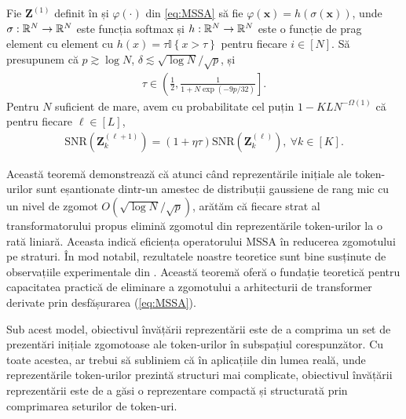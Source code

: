 \documentclass[../../book-main_ro.tex]{subfiles}
\begin{document}
\begin{theorem}\label{thm:1}
Fie $\bm Z^{(1)}$ definit în  și $\varphi(\cdot)$ din \eqref{eq:MSSA} să fie
$\varphi(\bm x) = h\left(\sigma(\bm x)\right)$,
unde $\sigma:\mathbb{R}^N \to \mathbb{R}^N$ este funcția softmax și $h:\mathbb{R}^N \to \mathbb{R}^N$ este o funcție de prag element cu element cu $h(x) = \tau \mathbb{I}\left\{x > \tau\right\}$ pentru fiecare $i \in [N]$. Să presupunem că $p \gtrsim \log N$, $\delta \lesssim \sqrt{\log N}/\sqrt{p}$, și
\begin{align*}
\tau \in \left( \frac{1}{2},  \frac{1}{1+N\exp(-9p/32)} \right].
\end{align*}
Pentru $N$ suficient de mare, avem cu probabilitate cel puțin $1-KLN^{-\Omega(1)}$ că pentru fiecare $\ell \in [L]$,
    \begin{align}\label{eq:SNR}
        \mathrm{SNR}(\bm Z_k^{(\ell+1)}) = (1+\eta\tau) \mathrm{SNR}(\bm Z_k^{(\ell)}),\ \forall k \in [K].
    \end{align}
\end{theorem}
Această teoremă demonstrează că atunci când reprezentările inițiale ale token-urilor sunt eșantionate dintr-un amestec de distribuții gaussiene de rang mic cu un nivel de zgomot $O(\sqrt{\log N}/\sqrt{p})$, arătăm că fiecare strat al transformatorului propus elimină zgomotul din reprezentările token-urilor la o rată liniară. Aceasta indică eficiența operatorului MSSA în reducerea zgomotului pe straturi. În mod notabil, rezultatele noastre teoretice sunt bine susținute de observațiile experimentale din . Această teoremă oferă o fundație teoretică pentru capacitatea practică de eliminare a zgomotului a arhitecturii de transformer derivate prin desfășurarea (\ref{eq:MSSA}).

\begin{remark}
    Sub acest model, obiectivul învățării reprezentării este de a comprima un set de prezentări inițiale zgomotoase ale token-urilor în subspațiul corespunzător. Cu toate acestea, ar trebui să subliniem că în aplicațiile din lumea reală, unde reprezentările token-urilor prezintă structuri mai complicate, obiectivul învățării reprezentării este de a găsi o reprezentare compactă și structurată prin comprimarea seturilor de token-uri.
\end{remark}
\end{document}
